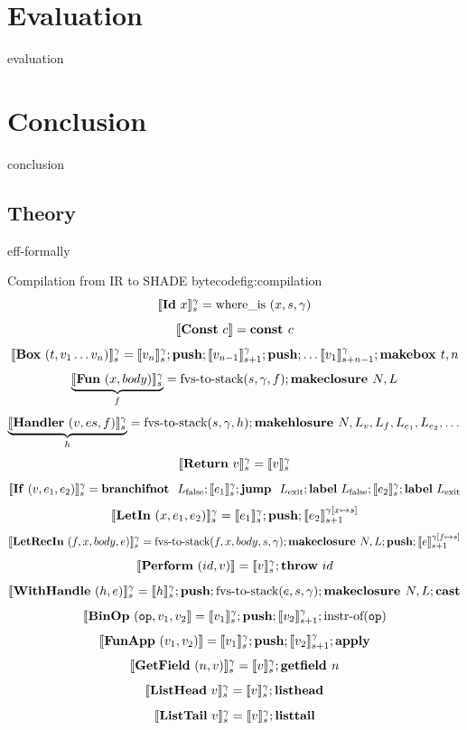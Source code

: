 \documentclass[%
    12pt,
    bibliography=toc,
    listof=leveldown,%
    oneside
]{book}
\begin{document}
\chapter{Evaluation}
{evaluation}

\chapter{Conclusion}
{conclusion}

{}


\appendix

\begin{appendices}
\renewcommand{\thepage}{\thechapter.\arabic{page}}

\chapter{Theory}
\label{app:theory}
\setcounter{page}{1}
{eff-formally}

\begin{myfigure}[1]{Compilation from IR to SHADE bytecode}{fig:compilation}
    $$ \interp{\irId\ x}_s^\gamma = \text{where\_is}\ (x, s, \gamma) $$
    $$ \interp{\irConst\ c} = \textbf{const } c $$
    $$ \llbracket \mathbf{Box}\ (t, v_1 \dots v_n) \rrbracket_s ^ \gamma = \llbracket v_n \rrbracket_s^\gamma; \textbf{push}; \llbracket v_{n-1} \rrbracket_{s+1}^\gamma; \textbf{push}; \dots \llbracket v_1 \rrbracket_{s+n-1}^\gamma; \textbf{makebox }t, n $$
    $$ \underbrace{\llbracket \mathbf{Fun}\ (x, body) \rrbracket_s ^\gamma }_f = \text{fvs-to-stack} (s, \gamma, f); \textbf{makeclosure }N, L $$
    $$ \underbrace{\llbracket \mathbf{Handler}\ (v, es, f) \rrbracket_s^\gamma}_h = \text{fvs-to-stack} (s, \gamma, h); \textbf{makehlosure }N, L_v, L_f, L_{e_1}, L_{e_2}, \dots $$
    $$ \llbracket \mathbf{Return}\ v \rrbracket_s ^ \gamma =  \llbracket v \rrbracket_s ^ \gamma $$
    $$ \llbracket \mathbf{If}\ (v, e_1, e_2) \rrbracket_s ^ \gamma = \textbf{branchifnot }\ L_\text{false}; \llbracket e_1 \rrbracket_s^\gamma; \textbf{jump }\ L_\text{exit}; \textbf{label}\ L_\text{false}; \llbracket e_2 \rrbracket_s^\gamma; \textbf{label}\ L_\text{exit} $$
    $$ \llbracket \mathbf{LetIn}\ (x, e_1, e_2) \rrbracket_s^\gamma = \llbracket e_1 \rrbracket_s^\gamma; \textbf{push}; \llbracket e_2 \rrbracket_{s+1}^{\gamma[x \mapsto s]} $$
    $$ \llbracket \mathbf{LetRecIn}\ (f, x, body, e) \rrbracket_s^\gamma = \text{fvs-to-stack}(f, x, body, s, \gamma); \textbf{makeclosure }N, L; \textbf{push}; \llbracket e \rrbracket_{s+1}^{\gamma[f \mapsto s]} $$
    $$ \llbracket \mathbf{Perform}\ (id, v) \rrbracket = \llbracket v \rrbracket_s ^ \gamma; \textbf{throw}\ id $$
    $$ \llbracket \mathbf{WithHandle}\ (h, e) \rrbracket_s ^ \gamma = \llbracket h \rrbracket_s ^ \gamma; \textbf{push}; \text{fvs-to-stack}(e, s, \gamma); \textbf{makeclosure }N, L; \mathbf{cast} $$
    $$ \llbracket \mathbf{BinOp}\ (\mathtt{op}, v_1, v_2 \rrbracket = \llbracket v_1 \rrbracket_s ^ \gamma; \textbf{push}; \llbracket v_2 \rrbracket_{s+1}^\gamma; \text{instr-of}(\mathtt{op}) $$
    $$ \llbracket \mathbf{FunApp}\ (v_1, v_2) \rrbracket = \llbracket v_1 \rrbracket_s ^ \gamma; \textbf{push}; \llbracket v_2 \rrbracket_{s+1} ^ \gamma; \textbf{apply} $$
    $$ \llbracket \mathbf{GetField}\ (n, v) \rrbracket_s ^ \gamma = \llbracket v \rrbracket_s ^ \gamma; \textbf{getfield }n $$
    $$ \llbracket \mathbf{ListHead}\ v \rrbracket_s ^ \gamma = \llbracket v \rrbracket_s ^ \gamma; \textbf{listhead} $$
    $$ \llbracket \mathbf{ListTail}\ v \rrbracket_s ^ \gamma = \llbracket v \rrbracket_s ^ \gamma ; \textbf{listtail} $$
\end{myfigure}


\end{appendices}
\end{document}
